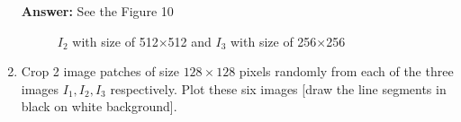\documentclass[11pt]{article}
\newcommand{\Answer}{\color{red}\textbf{Answer:} \color{black}}
\begin{document}
\begin{enumerate}
\Answer See the Figure 10
\begin{figure}[h]
    \centering
    \caption{$I_2$ with size of 512$\times$512 and $I_3$ with size of 256$\times$256}
\end{figure}

\item Crop 2 image patches of size $128 \times 128$ pixels randomly from each of the three images $I_1, I_2, I_3$ respectively. Plot these six images [draw the line segments in black on white background].


\end{enumerate}
\end{document}
